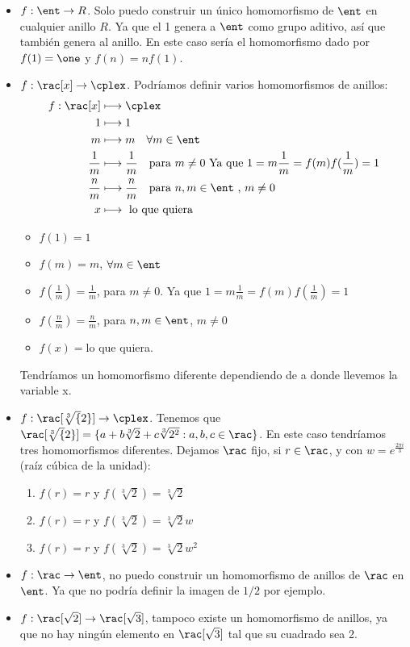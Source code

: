 \begin{example}
	\begin{itemize}
		\item $f:\ent \rightarrow R$. Solo puedo construir un único homomorfismo de $\ent$ en cualquier anillo $R$. Ya que el 1 genera a $\ent$ como grupo aditivo, así que también genera al anillo. En este caso sería el homomorfismo dado por $f(1)=\one$ y $f(n)=nf(1)$.
		\item $f: \rac[x] \rightarrow \cplex$. Podríamos definir varios homomorfismos de anillos:
		\begin{align*}
			f: \rac[x] & \longmapsto  \cplex \\
			 1 & \longmapsto  1\\
			 m & \longmapsto  m \quad \forall m \in \ent\\
			 \frac{1}{m} & \longmapsto  \frac{1}{m} \quad \text{para } m\neq 0 \text{ Ya que } 1=m\frac{1}{m}=f(m)f(\frac{1}{m})=1\\
			 \frac{n}{m} & \longmapsto  \frac{n}{m} \quad \text{para }n,m \in \ent \text{ , } m\neq 0\\
			 x & \longmapsto  \text{ lo que quiera }\\
		\end{align*}
		\begin{itemize}
			\item $f(1)=1$
			\item $f(m)=m$, $\forall m \in \ent$
			\item $f(\frac{1}{m})=\frac{1}{m}$, para $m\neq 0$. Ya que $1=m\frac{1}{m}=f(m)f(\frac{1}{m})=1$
			\item $f(\frac{n}{m})=\frac{n}{m}$, para $n,m \in \ent$, $m\neq 0$
			\item $f(x)=$lo que quiera.
		\end{itemize}
		 Tendríamos un homomorfismo diferente dependiendo de a donde llevemos la variable x.
		 \item $f: \rac[\sqrt[3]{2}]\rightarrow \cplex$. Tenemos que $\rac[\sqrt[3]{2}] = \{a+b\sqrt[3]{2}+c\sqrt[3]{2^2}:a,b,c \in \rac\}$. En este caso tendríamos tres homomorfismos diferentes. Dejamos $\rac$ fijo, si $r\in \rac$, y con $w=e^{\frac{2\pi i}{3}}$ (raíz cúbica de la unidad):
		 \begin{enumerate}
		 	\item $f(r)=r$ y $f(\sqrt[3]{2})=\sqrt[3]{2}$
		 	\item $f(r)=r$ y $f(\sqrt[3]{2})=\sqrt[3]{2}w$
			 \item $f(r)=r$ y $f(\sqrt[3]{2})=\sqrt[3]{2}w^2$
		 \end{enumerate}
		 \item $f: \rac \rightarrow \ent$, no puedo construir un homomorfismo de anillos de $\rac$ en $\ent$. Ya que no podría definir la imagen de $1/2$ por ejemplo.
		 \item $f: \rac[\sqrt{2}]\rightarrow \rac[\sqrt{3}]$, tampoco existe un homomorfismo de anillos, ya que no hay ningún elemento en $\rac[\sqrt{3}]$ tal que su cuadrado sea 2.
	\end{itemize}
\end{example}

